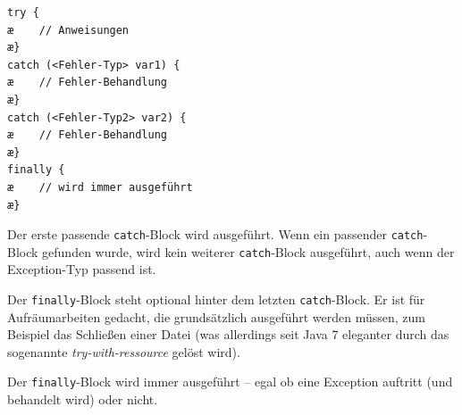 \begin{minipage}{0.35\textwidth}
\begin{lstlisting}
try {	
æ    // Anweisungen
æ}
catch (<Fehler-Typ> var1) {
æ    // Fehler-Behandlung
æ}
catch (<Fehler-Typ2> var2) {
æ    // Fehler-Behandlung
æ}
finally {
æ    // wird immer ausgeführt
æ}
\end{lstlisting}
\end{minipage}
\hfill
\begin{minipage}{0.6\textwidth}
\begin{compactitem}
\item Der erste passende \lstinline|catch|-Block wird ausgeführt. Wenn ein
passender \lstinline|catch|-Block gefunden wurde, wird kein weiterer
\lstinline|catch|-Block ausgeführt, auch wenn der Exception-Typ passend ist.

\item Der \lstinline|finally|-Block steht optional hinter dem letzten
\lstinline|catch|-Block.
Er ist für Aufräumarbeiten gedacht, die grundsätzlich ausgeführt werden müssen,
zum Beispiel das Schließen einer Datei (was allerdings seit Java 7 eleganter
durch das sogenannte {\em try-with-ressource} gelöst wird).

\item Der \lstinline|finally|-Block wird immer ausgeführt -- egal ob eine
Exception auftritt (und behandelt wird) oder nicht.
\end{compactitem}
\end{minipage}

